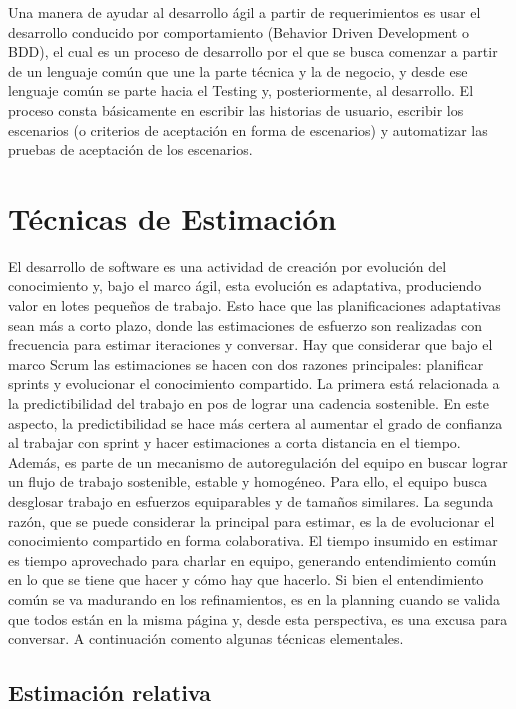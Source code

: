 Una manera de ayudar al desarrollo ágil a partir de requerimientos es usar el desarrollo conducido por comportamiento (Behavior Driven Development o BDD), el cual es un proceso de desarrollo por el que se busca comenzar a partir de un lenguaje común que une la parte técnica y la de negocio, y desde ese lenguaje común se parte hacia el Testing y, posteriormente, al desarrollo. El proceso consta básicamente en escribir las historias de usuario, escribir los escenarios (o criterios de aceptación en forma de escenarios) y automatizar las pruebas de aceptación de los escenarios.


\section{Técnicas de Estimación}

El desarrollo de software es una actividad de creación por evolución del conocimiento y, bajo el marco ágil, esta evolución es adaptativa, produciendo valor en lotes pequeños de trabajo. Esto hace que las planificaciones adaptativas sean más a corto plazo, donde las estimaciones de esfuerzo son realizadas con frecuencia para estimar iteraciones y conversar. Hay que considerar que bajo el marco Scrum las estimaciones se hacen con dos razones principales: planificar sprints y evolucionar el conocimiento compartido. La primera está relacionada a la predictibilidad del trabajo en pos de lograr una cadencia sostenible. En este aspecto, la predictibilidad se hace más certera al aumentar el grado de confianza al trabajar con sprint y hacer estimaciones a corta distancia en el tiempo. Además, es parte de un mecanismo de autoregulación del equipo en buscar lograr un flujo de trabajo sostenible, estable y homogéneo. Para ello, el equipo busca desglosar trabajo en esfuerzos equiparables y de tamaños similares. La segunda razón, que se puede considerar la principal para estimar, es la de evolucionar el conocimiento compartido en forma colaborativa. El tiempo insumido en estimar es tiempo aprovechado para charlar en equipo, generando entendimiento común en lo que se tiene que hacer y cómo hay que hacerlo. Si bien el entendimiento común se va madurando en los refinamientos, es en la planning cuando se valida que todos están en la misma página y, desde esta perspectiva, es una excusa para conversar. A continuación comento algunas técnicas elementales.

\subsection{Estimación relativa}

